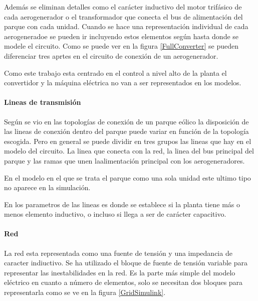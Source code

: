\documentclass{book}
\begin{document}
Además se eliminan detalles como el car\'acter inductivo del motor trif\'asico de cada aerogenerador o el transformador que conecta el bus de alimentaci\'on del parque con cada unidad. Cuando se hace una representaci\'on individual de cada aerogeneradoe se pueden ir incluyendo estos elementos seg\'un hasta donde se modele el circuito. Como se puede ver en la figura \ref{FullConverter} se pueden diferenciar tres aprtes en el circuito de conexi\'on de un aerogenerador. 


Como este trabajo esta centrado en el control a nivel alto de la planta el convertidor y la m\'aquina el\'ectrica no van a ser representados en los modelos. \par
		
		\paragraph{Lineas de transmisi\'on}

Seg\'un se vio en las topolog\'ias de conexi\'on de un parque e\'olico la disposici\'on de las lineas de conexi\'on dentro del parque puede variar en funci\'on de la topolog\'ia escogida. Pero en general se puede dividir en tres grupos las lineas que hay en el modelo del circuito. La linea que conecta con la red, la linea del bus principal del parque y las ramas que unen laalimentaci\'on principal con los aerogeneradores. \par

En el modelo en el que se trata el parque como una sola unidad este ultimo tipo no aparece en la simulaci\'on. \par

En los parametros de las lineas es donde se establece si la planta tiene más o menos elemento inductivo, o incluso si llega a ser de car\'acter capacitivo. \par


		\paragraph{Red} 

La red esta representada como una fuente de tensi\'on y una impedancia de caracter indiuctivo. Se ha utilizado el bloque de fuente de tensi\'on variable para representar las inestabilidades en la red. Es la parte más simple del modelo el\'ectrico en cuanto a n\'umero de elementos, solo se necesitan dos bloques para representarla como se ve en la figura \ref{GridSimulink}. \par
\end{document}
